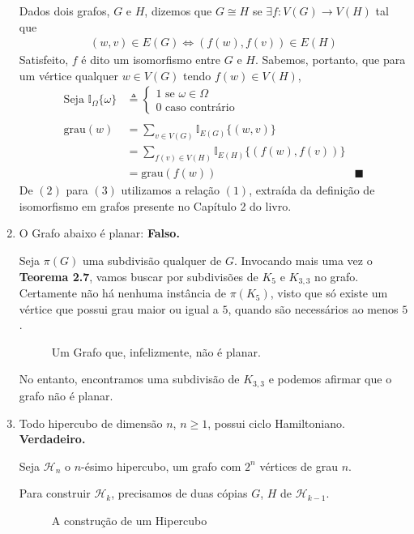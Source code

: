 \documentclass{homework}
\newcommand{\cqd}{%
	\ensuremath{\blacksquare}
}
\begin{document}
\begin{enumerate}[label=\textbf{\arabic*)}]
	Dados dois grafos, $G$ e $H$, dizemos que $G \cong H$ se $\exists f : V(G) \to V(H)$ tal que
		\begin{align}
			(w, v) \in E(G) \iff (f(w), f(v)) \in E(H)
		\end{align}
	Satisfeito, $f$ é dito um isomorfismo entre $G$ e $H$. Sabemos, portanto, que para um vértice qualquer $w \in V(G)$ tendo $f(w) \in V(H)$,
		\begin{align}
		\text{Seja } \mathbb{I}_{\Omega}\{\omega\} &\triangleq \begin{cases}
		1 \text{ se } \omega \in \Omega\\
		0 \text{ caso contrário}
		\end{cases} \nonumber \\
		~ \nonumber \\
		\text{grau}(w) &= \sum_{v \in V(G)} \mathbb{I}_{E(G)}\{(w, v)\}\\
					   &= \sum_{f(v) \in V(H)} \mathbb{I}_{E(H)}\{(f(w), f(v))\}\\
					   &= \text{grau}(f(w)) & \cqd \nonumber
		\end{align}
	De $(2)$ para $(3)$ utilizamos a relação $(1)$, extraída da definição de isomorfismo em grafos presente no Capítulo 2 do livro\cite{jayme:18}.
	
	\item O Grafo abaixo é planar: \textbf{Falso.} \par
	
	Seja $\pi(G)$ uma subdivisão qualquer de $G$. Invocando mais uma vez o \textbf{Teorema 2.7}\cite{jayme:18}, vamos buscar por subdivisões de $K_5$ e $K_{3, 3}$ no grafo. Certamente não há nenhuma instância de $\pi(K_5)$, visto que só existe um vértice que possui grau maior ou igual a $5$, quando são necessários ao menos $5$.
	
	\begin{figure}[H]
		\centering
		
		\caption{Um Grafo que, infelizmente, não é planar.}
		\label{fig:1.5.1}
	\end{figure}
	
	No entanto, encontramos uma subdivisão de $K_{3, 3}$ e podemos afirmar que o grafo não é planar.
	
	\item Todo hipercubo de dimensão $n$, $n \ge 1$, possui ciclo Hamiltoniano. \textbf{Verdadeiro.}
	
	Seja $\mathscr{H}_n$ o $n$-ésimo hipercubo, um grafo com $2^n$ vértices de grau $n$. \par
	
	Para construir $\mathscr{H}_k$, precisamos de duas cópias $G$, $H$ de $\mathscr{H}_{k-1}$.

	\begin{figure}[H]
		\centering
		
		\caption{A construção de um Hipercubo}
		\label{fig:1.6.1}
	\end{figure}
	
		
	\end{enumerate}
\end{document}
